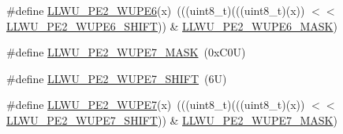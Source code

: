 \begin{DoxyCompactItemize}
\item 
\#define \mbox{\hyperlink{group___l_l_w_u___register___masks_gaa96b35faf789a4b85552957c8227c1e0}{L\+L\+W\+U\+\_\+\+P\+E2\+\_\+\+W\+U\+P\+E6}}(x)~(((uint8\+\_\+t)(((uint8\+\_\+t)(x)) $<$$<$ \mbox{\hyperlink{group___l_l_w_u___register___masks_gaa7a0191eaf60166333a8bee953239c85}{L\+L\+W\+U\+\_\+\+P\+E2\+\_\+\+W\+U\+P\+E6\+\_\+\+S\+H\+I\+FT}})) \& \mbox{\hyperlink{group___l_l_w_u___register___masks_ga0db50e96153e1ca74874da97d1c22f41}{L\+L\+W\+U\+\_\+\+P\+E2\+\_\+\+W\+U\+P\+E6\+\_\+\+M\+A\+SK}})
\item 
\#define \mbox{\hyperlink{group___l_l_w_u___register___masks_ga39b30f51fdd7f83bb5aa29bf2bc87c26}{L\+L\+W\+U\+\_\+\+P\+E2\+\_\+\+W\+U\+P\+E7\+\_\+\+M\+A\+SK}}~(0x\+C0\+U)
\item 
\#define \mbox{\hyperlink{group___l_l_w_u___register___masks_ga82bfb99732d7f90dacdc01ef5222a59a}{L\+L\+W\+U\+\_\+\+P\+E2\+\_\+\+W\+U\+P\+E7\+\_\+\+S\+H\+I\+FT}}~(6\+U)
\item 
\#define \mbox{\hyperlink{group___l_l_w_u___register___masks_gaecb28f5285444e1576a192260d5c3048}{L\+L\+W\+U\+\_\+\+P\+E2\+\_\+\+W\+U\+P\+E7}}(x)~(((uint8\+\_\+t)(((uint8\+\_\+t)(x)) $<$$<$ \mbox{\hyperlink{group___l_l_w_u___register___masks_ga82bfb99732d7f90dacdc01ef5222a59a}{L\+L\+W\+U\+\_\+\+P\+E2\+\_\+\+W\+U\+P\+E7\+\_\+\+S\+H\+I\+FT}})) \& \mbox{\hyperlink{group___l_l_w_u___register___masks_ga39b30f51fdd7f83bb5aa29bf2bc87c26}{L\+L\+W\+U\+\_\+\+P\+E2\+\_\+\+W\+U\+P\+E7\+\_\+\+M\+A\+SK}})
\end{DoxyCompactItemize}
